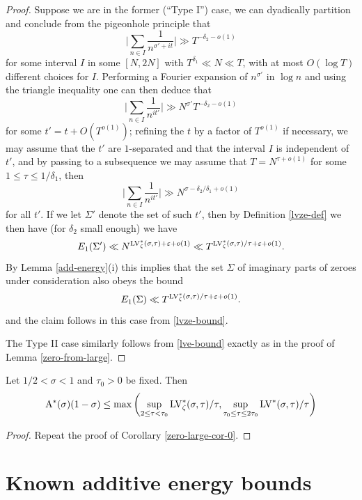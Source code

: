 \begin{proof}
Suppose we are in the former (``Type I'') case, we can dyadically partition and conclude from the pigeonhole principle that
$$ \bigg| \sum_{n \in I} \frac{1}{n^{\sigma'+it}} \bigg| \gg T^{-\delta_2-o(1)}$$
for some interval $I$ in some $[N,2N]$ with $T^{\delta_1} \ll N \ll T$, with at most $O(\log T)$ different choices for $I$.  Performing a Fourier expansion of $n^{\sigma'}$ in $\log n$ and using the triangle inequality one can then deduce that
$$ \bigg| \sum_{n \in I} \frac{1}{n^{it'}} \bigg| \gg N^{\sigma'} T^{-\delta_2-o(1)}$$
for some $t' = t + O(T^{o(1)})$; refining the $t$ by a factor of $T^{o(1)}$ if necessary, we may assume that the $t'$ are $1$-separated and that the interval $I$ is independent of $t'$, and by passing to a subsequence we may assume that $T = N^{\tau+o(1)}$ for some $1 \leq \tau \leq 1/\delta_1$, then
$$ \bigg| \sum_{n \in I} \frac{1}{n^{it'}} \bigg| \gg N^{\sigma-\delta_2/\delta_1+o(1)}$$
for all $t'$.  If we let $\Sigma'$ denote the set of such $t'$, then by Definition \ref{lvze-def} we then have (for $\delta_2$ small enough) we have
$$ E_1(\Sigma') \ll N^{\mathrm{LV}^*_\zeta(\sigma,\tau) + \varepsilon + o(1)} \ll T^{\mathrm{LV}^*_\zeta(\sigma,\tau)/\tau + \varepsilon + o(1)}.$$
By Lemma \ref{add-energy}(i) this implies that the set $\Sigma$ of imaginary parts of zeroes under consideration also obeys the bound
$$ E_1(\Sigma) \ll T^{\mathrm{LV}^*_\zeta(\sigma,\tau)/\tau + \varepsilon + o(1)}.$$
and the claim follows in this case from \eqref{lvze-bound}.

The Type II case similarly follows from \eqref{lve-bound} exactly as in the proof of Lemma \ref{zero-from-large}.
\end{proof}


\begin{corollary}\label{zeroe-large-cor-0} Let $1/2 < \sigma < 1$ and $\tau_0 > 0$ be fixed.  Then
$$ \mathrm{A}^*(\sigma)(1-\sigma) \leq \max \left(\sup_{2 \leq \tau < \tau_0} \mathrm{LV}^*_\zeta(\sigma,\tau)/\tau, \sup_{\tau_0 \leq \tau \leq 2\tau_0} \mathrm{LV}^*(\sigma,\tau)/\tau\right)$$
\end{corollary}


\begin{proof}  Repeat the proof of Corollary \ref{zero-large-cor-0}.
\end{proof}

\section{Known additive energy bounds}

